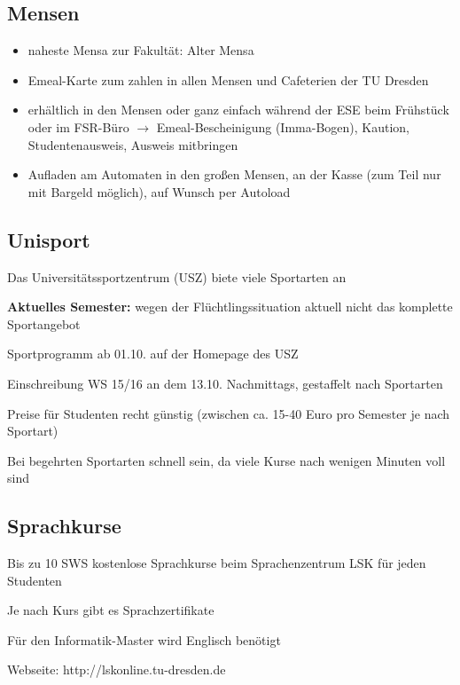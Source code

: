 \documentclass[a4paper,12pt]{report}
\begin{document}
\subsection{Mensen}
\begin{itemize}
	\item naheste Mensa zur Fakultät: Alter Mensa
	\item Emeal-Karte zum zahlen in allen Mensen und Cafeterien der TU Dresden
	\item erhältlich in den Mensen oder ganz einfach während der ESE beim Frühstück oder im FSR-Büro
	$\rightarrow$ Emeal-Bescheinigung (Imma-Bogen),  Kaution, Studentenausweis, Ausweis mitbringen
	\item Aufladen am Automaten in den großen Mensen, an der Kasse (zum Teil nur mit Bargeld möglich), auf Wunsch per Autoload
\end{itemize}

\subsection{Unisport}
Das Universitätssportzentrum (USZ) biete viele Sportarten an
\begin{itemize*}
\item \textbf{Aktuelles Semester:} wegen der Flüchtlingssituation aktuell nicht das komplette Sportangebot
\item Sportprogramm ab 01.10. auf der Homepage des USZ
\item Einschreibung WS 15/16 an dem 13.10. Nachmittags, gestaffelt nach Sportarten
\item Preise für Studenten recht günstig (zwischen ca. 15-40 Euro pro Semester je nach Sportart)
\item Bei begehrten Sportarten schnell sein, da viele Kurse nach wenigen Minuten voll sind
\end{itemize*}

\subsection{Sprachkurse}
\begin{itemize*}
\item Bis zu 10 SWS kostenlose Sprachkurse beim Sprachenzentrum LSK für jeden Studenten
\item Je nach Kurs gibt es Sprachzertifikate
\item Für den Informatik-Master wird Englisch benötigt
\item Webseite: http://lskonline.tu-dresden.de
\end{itemize*}
\end{document}
